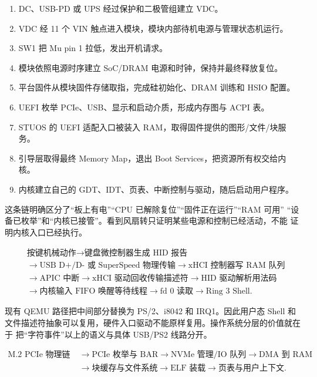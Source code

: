 \par
\begin{enumerate}[leftmargin=2em]
  \item DC、USB-PD 或 UPS 经过保护和二极管组建立 VDC。
  \item VDC 经 11 个 VIN 触点进入模块，模块内部待机电源与管理状态机运行。
  \item SW1 把 Mu pin 1  拉低，发出开机请求。
  \item 模块依照电源时序建立 SoC/DRAM 电源和时钟，保持并最终释放复位。
  \item 平台固件从模块固件存储取指，完成硅初始化、DRAM 训练和 HSIO 配置。
  \item UEFI 枚举 PCIe、USB、显示和启动介质，形成内存图与 ACPI 表。
  \item STUOS 的 UEFI 适配入口被装入 RAM，取得固件提供的图形/文件/块服务。
  \item 引导层取得最终 Memory Map，退出 Boot Services，把资源所有权交给内核。
  \item 内核建立自己的 GDT、IDT、页表、中断控制与驱动，随后启动用户程序。
\end{enumerate}

这条链明确区分了“板上有电”“CPU 已解除复位”“固件正在运行”“RAM 可用”
“设备已枚举”和“内核已接管”。看到风扇转只证明某些电源和控制已经活动，不能
证明内核入口已经执行。

\par
\[
\begin{aligned}
&\text{按键机械动作}
\rightarrow \text{键盘微控制器生成 HID 报告}\\
&\rightarrow \text{USB D+/D- 或 SuperSpeed 物理传输}
\rightarrow \text{xHCI 控制器写 RAM 队列}\\
&\rightarrow \text{APIC 中断}
\rightarrow \text{xHCI 驱动回收传输描述符}
\rightarrow \text{HID 驱动解析用法码}\\
&\rightarrow \text{内核输入 FIFO 唤醒等待线程}
\rightarrow \text{fd 0 读取}
\rightarrow \text{Ring 3 Shell}.
\end{aligned}
\]

现有 QEMU 路径把中间部分替换为 PS/2、i8042 和 IRQ1。因此用户态 Shell 和
文件描述符抽象可以复用，硬件入口驱动不能原样复用。操作系统分层的价值就在于
把“字符事件”以上的语义与具体 USB/PS2 线路分开。

\par
\[
\begin{aligned}
\text{M.2 PCIe 物理链路}
&\rightarrow \text{PCIe 枚举与 BAR}
\rightarrow \text{NVMe 管理/IO 队列}
\rightarrow \text{DMA 到 RAM}\\
&\rightarrow \text{块缓存与文件系统}
\rightarrow \text{ELF 装载}
\rightarrow \text{页表与用户上下文}.
\end{aligned}
\]

